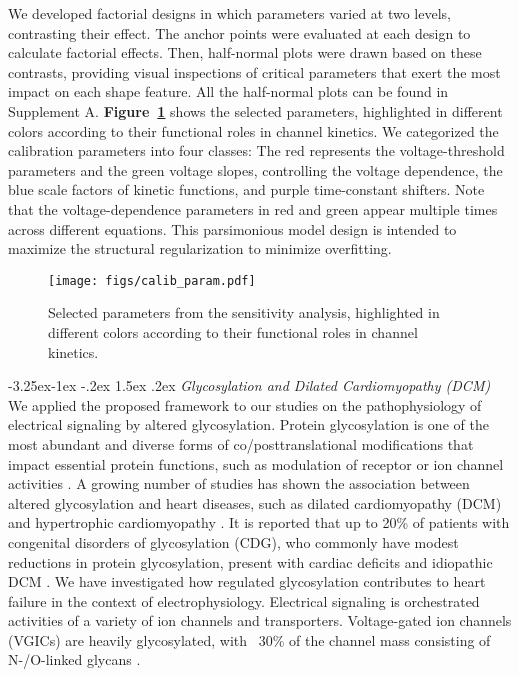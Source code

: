 \documentclass[11pt]{article}
\makeatletter
\renewcommand\subsection{\@startsection{subsection}{2}{\z@}%
                                     {-3.25ex\@plus -1ex \@minus -.2ex}%
                                     {1.5ex \@plus .2ex}%
                                     {\normalfont\fontfamily{phv}\fontsize{14}{17}\bfseries}}
\makeatother
\begin{document}
We developed factorial designs in which parameters varied at two levels, contrasting their effect. The anchor points were evaluated at each design to calculate factorial effects. Then, half-normal plots were drawn based on these contrasts, providing visual inspections of critical parameters that exert the most impact on each shape feature. All the half-normal plots can be found in Supplement A. \textbf{Figure~\ref{fig:calib_param}} shows the selected parameters, highlighted in different colors according to their functional roles in channel kinetics. We categorized the calibration parameters into four classes: The red represents the voltage-threshold parameters and the green voltage slopes, controlling the voltage dependence, the blue scale factors of kinetic functions, and purple time-constant shifters. Note that the voltage-dependence parameters in red and green appear multiple times across different equations. This parsimonious model design is intended to maximize the structural regularization to minimize overfitting.
\begin{figure}[!ht]
    \centering
    \texttt{[image: figs/calib\_param.pdf]}
    \caption{Selected parameters from the sensitivity analysis, highlighted in different colors according to their functional roles in channel kinetics.}
    \label{fig:calib_param}
\end{figure}

\subsection{\emph{Glycosylation and Dilated Cardiomyopathy (DCM)}} \label{s:methods.4}
We applied the proposed framework to our studies on the pathophysiology of electrical signaling by altered glycosylation. Protein glycosylation is one of the most abundant and diverse forms of co/posttranslational modifications that impact essential protein functions, such as modulation of receptor or ion channel activities \citep{ohtsubo2006glycosylation,ednie2012modulation}. A growing number of studies has shown the association between altered glycosylation and heart diseases, such as dilated cardiomyopathy (DCM) and hypertrophic cardiomyopathy \citep{ohtsubo2006glycosylation,ednie2019reduced2}. It is reported that up to 20\% of patients with congenital disorders of glycosylation (CDG), who commonly have modest reductions in protein glycosylation, present with cardiac deficits and idiopathic DCM \citep{marques2017cardiac}. We have investigated how regulated glycosylation contributes to heart failure in the context of electrophysiology. Electrical signaling is orchestrated activities of a variety of ion channels and transporters. Voltage-gated ion channels (VGICs) are heavily glycosylated, with ~30\% of the channel mass consisting of N-/O-linked glycans \citep{ednie2012modulation}.
\end{document}
